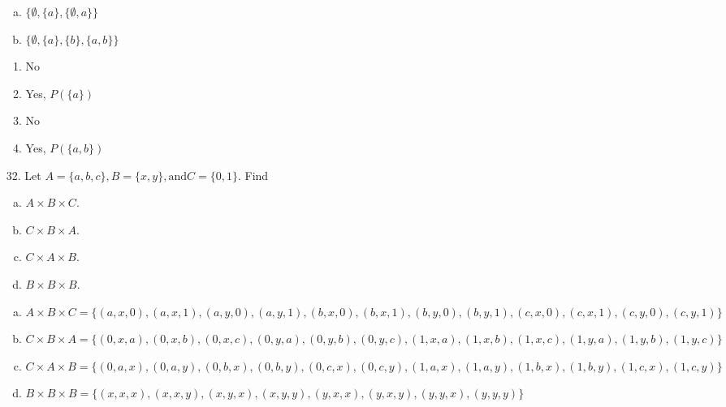 \begin{itemize}
\begin{enumerate}[a.]
            \item $\{\emptyset, \{a\}, \{\emptyset, a\}\}$
            \item $\{\emptyset, \{a\}, \{b\}, \{a, b\}\}$
         \end{enumerate}
         \answer
         \begin{enumerate}
            \item No
            \item Yes, $P(\{a\})$
            \item No
            \item Yes, $P(\{a, b\})$
         \end{enumerate}
   \item [32.] Let $A = \{a, b, c\}, B = \{x, y\}, \text{and} C = \{0, 1\}$. Find
         \begin{enumerate}[a.]
            \item $A \times B \times C$.
            \item $C \times B \times A$.
            \item $C \times A \times B$.
            \item $B \times B \times B$.
         \end{enumerate}
         \answer
         \begin{enumerate}[a.]
            \item $A \times B \times C = \{(a, x, 0), (a, x, 1), (a, y, 0), (a, y, 1), (b, x, 0), (b, x, 1), (b, y, 0), (b, y, 1), (c, x, 0), (c, x, 1), (c, y, 0), (c, y, 1)\}$
            \item $C \times B \times A = \{(0, x, a), (0, x, b), (0, x, c), (0, y, a), (0, y, b), (0, y, c), (1, x, a), (1, x, b), (1, x, c), (1, y, a), (1, y, b), (1, y, c)\}$
            \item $C \times A \times B = \{(0, a, x), (0, a, y), (0, b, x), (0, b, y), (0, c, x), (0, c, y), (1, a, x), (1, a, y), (1, b, x), (1, b, y), (1, c, x), (1, c, y)\}$
            \item $B \times B \times B = \{(x, x, x), (x, x, y), (x, y, x), (x, y, y), (y, x, x), (y, x, y), (y, y, x), (y, y, y)\}$
         \end{enumerate}
\end{itemize}

